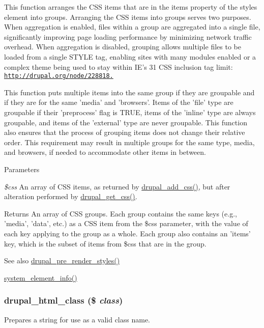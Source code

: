 This function arranges the CSS items that are in the items property of the styles element into groups. Arranging the CSS items into groups serves two purposes. When aggregation is enabled, files within a group are aggregated into a single file, significantly improving page loading performance by minimizing network traffic overhead. When aggregation is disabled, grouping allows multiple files to be loaded from a single STYLE tag, enabling sites with many modules enabled or a complex theme being used to stay within IE's 31 CSS inclusion tag limit: \href{http://drupal.org/node/228818.}{\tt http://drupal.org/node/228818.}

This function puts multiple items into the same group if they are groupable and if they are for the same 'media' and 'browsers'. Items of the 'file' type are groupable if their 'preprocess' flag is TRUE, items of the 'inline' type are always groupable, and items of the 'external' type are never groupable. This function also ensures that the process of grouping items does not change their relative order. This requirement may result in multiple groups for the same type, media, and browsers, if needed to accommodate other items in between.


\begin{DoxyParams}{Parameters}
\item[{\em \$css}]An array of CSS items, as returned by \hyperlink{common_8inc_a2c5bb2667efb44b02f1a105c0bfdebe5}{drupal\_\-add\_\-css()}, but after alteration performed by \hyperlink{common_8inc_a2e308371f339fbb54967045ccbe4e88c}{drupal\_\-get\_\-css()}.\end{DoxyParams}
\begin{DoxyReturn}{Returns}
An array of CSS groups. Each group contains the same keys (e.g., 'media', 'data', etc.) as a CSS item from the \$css parameter, with the value of each key applying to the group as a whole. Each group also contains an 'items' key, which is the subset of items from \$css that are in the group.
\end{DoxyReturn}
\begin{DoxySeeAlso}{See also}
\hyperlink{common_8inc_a4b3889176f5132daa3f56a861d19aa95}{drupal\_\-pre\_\-render\_\-styles()} 

\hyperlink{system_8module_a39faa9a5430a70bb37a3c8af72460a14}{system\_\-element\_\-info()} 
\end{DoxySeeAlso}
\hypertarget{common_8inc_aba9dd2b04e8c797c0f0edc9098cbbd48}{
\subsubsection[{drupal\_\-html\_\-class}]{\setlength{\rightskip}{0pt plus 5cm}drupal\_\-html\_\-class (\$ {\em class})}}
\label{common_8inc_aba9dd2b04e8c797c0f0edc9098cbbd48}
Prepares a string for use as a valid class name.

